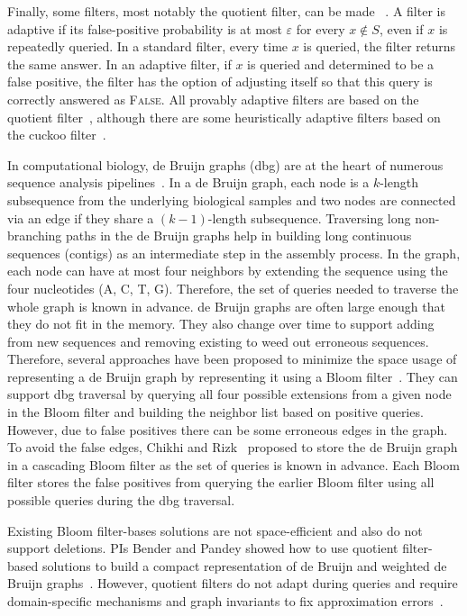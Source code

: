 Finally, some filters, most notably the quotient filter, can be made ~\cite{BenderFaGo18}.  A filter is adaptive if its false-positive probability is at most $\varepsilon$ for every $x\notin S$, even if $x$ is repeatedly queried.  In a standard filter, every time $x$ is queried, the filter returns the same answer.  In an adaptive filter, if $x$ is queried and determined to be a false positive, the filter has the option of adjusting itself so that this query is correctly answered as \textsc{False}.  All provably adaptive filters are based on the quotient filter~\cite{BenderFaGo18,Lee21}, although there are some heuristically adaptive filters based on the cuckoo filter~\cite{Mitzenmacher2020}.

  In computational biology, de Bruijn graphs (dbg) are at the heart of numerous sequence analysis pipelines~\cite{PandeyBJP17a, PandeyBJP17b}. In a de Bruijn graph, each node is a $k$-length subsequence from the underlying biological samples and two nodes are connected via an edge if they share a $(k-1)$-length subsequence.  Traversing long non-branching paths in the de Bruijn graphs help in building long continuous sequences (contigs) as an intermediate step in the assembly process.
In the graph, each node can have at most four neighbors by extending the sequence using the four nucleotides (A, C, T, G). Therefore, the set of queries needed to traverse the whole graph is known in advance.
%
de Bruijn graphs are often large enough that they do not fit in the memory. They also change over time to support adding \kmers from new sequences and removing existing \kmers to weed out erroneous sequences.
Therefore, several approaches have been proposed to minimize the space usage of representing a de Bruijn graph by representing it using a Bloom filter~\cite{chikhi2013space}. They can support dbg traversal by querying all four possible extensions from a given node in the Bloom filter and building the neighbor list based on positive queries. However, due to false positives there can be some erroneous edges in the graph.
To avoid the false edges, Chikhi and Rizk~\cite{chikhi2013space} proposed to store the de Bruijn graph in a cascading Bloom filter as the set of queries is known in advance. Each Bloom filter stores the false positives from querying the earlier Bloom filter using all possible queries during the dbg traversal.

Existing Bloom filter-bases solutions are not space-efficient and also do not support deletions. PIs Bender and Pandey showed how to use quotient filter-based solutions to build a compact representation of de Bruijn and weighted de Bruijn graphs~\cite{PandeyBJP17b}. However, quotient filters do not adapt during queries and require domain-specific mechanisms and graph invariants to fix approximation errors~\cite{PandeyBJP17b}.

